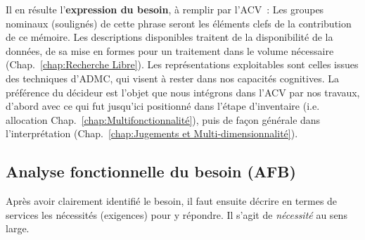 Il en résulte l'\textbf{expression du besoin}, à remplir par l'ACV~:
Les groupes nominaux (soulignés) de cette phrase seront les éléments clefs de la contribution de ce mémoire.
Les descriptions disponibles traitent de la disponibilité de la données, de sa mise en formes pour un traitement dans le volume nécessaire (Chap.~\ref{chap:Recherche Libre}).
Les représentations exploitables sont celles issues des techniques d'\gls{ADMC}, qui visent à rester dans nos capacités cognitives.
La préférence du décideur est l'objet que nous intégrons dans l'\gls{ACV} par nos travaux, d'abord avec ce qui fut jusqu'ici positionné dans l'étape d'inventaire (i.e. allocation Chap.~\ref{chap:Multifonctionnalité}), puis de façon générale dans l'interprétation (Chap.~\ref{chap:Jugements et Multi-dimensionnalité}).



\subsection{Analyse fonctionnelle du besoin (\acrshort{AFB})}
Après avoir clairement identifié le besoin, il faut ensuite décrire en termes de services les nécessités (exigences) pour y répondre.
Il s'agit de \emph{nécessité} au sens large.
